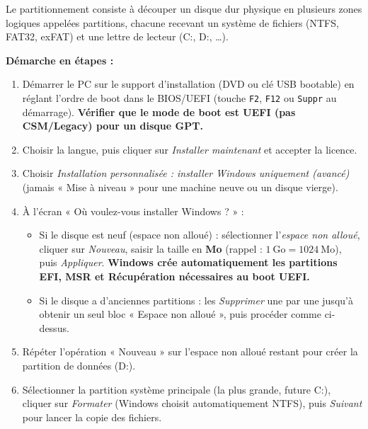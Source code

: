 \documentclass[11pt]{article}
\newcommand{\cle}[1]{{\popxbold\color{popdark}#1}}
\begin{document}
\begin{methode}
Le partitionnement consiste à découper un disque dur physique en plusieurs zones logiques appelées \cle{partitions}, chacune recevant un \cle{système de fichiers} (NTFS, FAT32, exFAT) et une lettre de lecteur (C:, D:, \dots).

\textbf{Démarche en étapes :}
\begin{enumerate}
  \item Démarrer le PC sur le support d'installation (DVD ou clé USB bootable) en réglant l'ordre de boot dans le BIOS/UEFI (touche \texttt{F2}, \texttt{F12} ou \texttt{Suppr} au démarrage). \textbf{Vérifier que le mode de boot est UEFI (pas CSM/Legacy) pour un disque GPT.}
  \item Choisir la langue, puis cliquer sur \emph{Installer maintenant} et accepter la licence.
  \item Choisir \emph{Installation personnalisée : installer Windows uniquement (avancé)} (jamais « Mise à niveau » pour une machine neuve ou un disque vierge).
  \item À l'écran « Où voulez-vous installer Windows ? » :
        \begin{itemize}
          \item Si le disque est neuf (espace non alloué) : sélectionner l'\emph{espace non alloué}, cliquer sur \emph{Nouveau}, saisir la taille en \textbf{Mo} (rappel : $1~\text{Go} = 1024~\text{Mo}$), puis \emph{Appliquer}. \textbf{Windows crée automatiquement les partitions EFI, MSR et Récupération nécessaires au boot UEFI.}
          \item Si le disque a d'anciennes partitions : les \emph{Supprimer} une par une jusqu'à obtenir un seul bloc « Espace non alloué », puis procéder comme ci-dessus.
        \end{itemize}
  \item Répéter l'opération « Nouveau » sur l'espace non alloué restant pour créer la partition de données (D:).
  \item Sélectionner la partition système principale (la plus grande, future C:), cliquer sur \emph{Formater} (Windows choisit automatiquement NTFS), puis \emph{Suivant} pour lancer la copie des fichiers.
\end{enumerate}


\end{methode}
\end{document}
